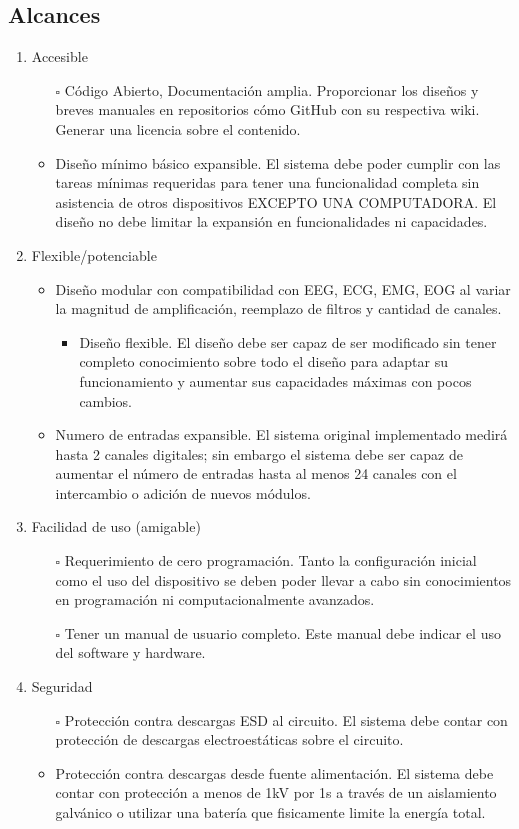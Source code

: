 \subsection{Alcances}
\label{sec:org59ed485}
\begin{enumerate}
\item Accesible
\begin{itemize}
\item[{$\square$}] Código Abierto, Documentación amplia. Proporcionar los diseños y breves manuales en repositorios cómo GitHub con su respectiva wiki. Generar una licencia sobre el contenido.
\item Diseño mínimo básico expansible. El sistema debe poder cumplir con las tareas mínimas requeridas para tener una funcionalidad completa sin asistencia de otros dispositivos EXCEPTO UNA COMPUTADORA. El diseño no debe limitar la expansión en funcionalidades ni capacidades.
\end{itemize}
\item Flexible/potenciable
\begin{itemize}
\item Diseño modular con compatibilidad con EEG, ECG, EMG, EOG al variar la magnitud de amplificación, reemplazo de filtros y cantidad de canales.
\begin{itemize}
\item Diseño flexible. El diseño debe ser capaz de ser modificado sin tener completo conocimiento sobre todo el diseño para adaptar su funcionamiento y aumentar sus capacidades máximas con pocos cambios.
\end{itemize}
\item Numero de entradas expansible. El sistema original implementado medirá hasta 2 canales digitales; sin embargo el sistema debe ser capaz de aumentar el número de entradas hasta al menos 24 canales con el intercambio o adición de nuevos módulos.
\end{itemize}
\item Facilidad de uso (amigable)
\begin{itemize}
\item[{$\square$}] Requerimiento de cero programación. Tanto la configuración inicial como el uso del dispositivo se deben poder llevar a cabo sin conocimientos en programación ni computacionalmente avanzados.
\item[{$\square$}] Tener un manual de usuario completo. Este manual debe indicar el uso del software y hardware.
\end{itemize}
\item Seguridad
\begin{itemize}
\item[{$\square$}] Protección contra descargas ESD al circuito. El sistema debe contar con protección de descargas electroestáticas sobre el circuito.
\item Protección contra descargas desde fuente alimentación. El sistema debe contar con protección a menos de 1kV por 1s a través de un aislamiento galvánico o utilizar una batería que fisicamente limite la energía total.
\end{itemize}
\end{enumerate}

